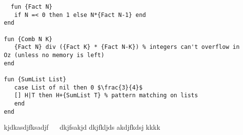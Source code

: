\documentclass[a4paper, 12pt]{book}
\begin{document}
\begin{lstlisting}
  fun {Fact N}
   if N =< 0 then 1 else N*{Fact N-1} end
end
 
fun {Comb N K}
   {Fact N} div ({Fact K} * {Fact N-K}) % integers can't overflow in Oz (unless no memory is left)
end
 
fun {SumList List}
   case List of nil then 0 $\frac{3}{4}$
   [] H|T then H+{SumList T} % pattern matching on lists
   end
end
\end{lstlisting}

kjdkasdjfksadjf ~~ dkjfsakjd dkjfkljds akdjfkdsj kkkk



\end{document}
